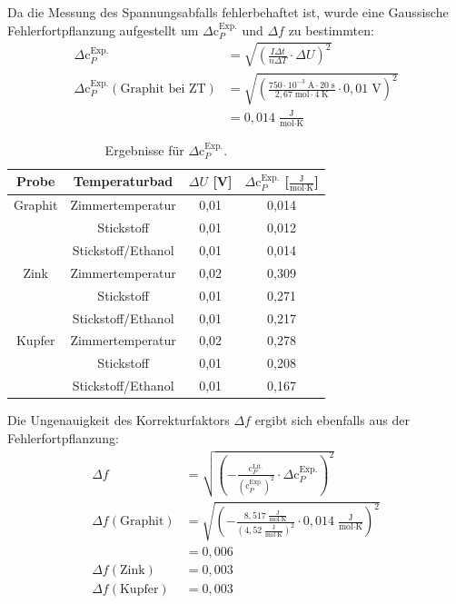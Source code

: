 \documentclass[12pt,a4paper,titlepage,headinclude,bibtotoc]{scrartcl}
\begin{document}
Da die Messung des Spannungsabfalls fehlerbehaftet ist, wurde eine Gaussische Fehlerfortpflanzung aufgestellt um $\Delta\text{c}_P^{\text{Exp.}}$ und $\Delta f$ zu bestimmten:
\begin{align}
\Delta \text{c}_P^{\text{Exp.}}&=\sqrt{ \left(\frac{I\Delta t}{n\Delta T}\cdot \Delta U \right)^2}\\
\Delta \text{c}_P^{\text{Exp.}}(\text{Graphit bei ZT})&=\sqrt{ \left(\frac{750\cdot 10^{-3}\;\text{A} \cdot 20\;\text{s}}{2,67\;\text{mol}\cdot 4\;\text{K}}\cdot 0,01\;\text{V} \right)^2}\\
&=0,014 \;\frac{\text{J}}{\text{mol}\cdot\text{K}}
\end{align}
\begin{table}[h!]
\centering
\caption{Ergebnisse für $\Delta \text{c}_P^{\text{Exp.}}$.}
\begin{tabular}{c|c|c|c}
Probe&Temperaturbad&$\Delta U$ [V]&$\Delta \text{c}_P^{\text{Exp.}}$ [$\frac{\text{J}}{\text{mol}\cdot\text{K}}$]\\
\hline
Graphit& Zimmertemperatur&0,01&0,014\\
\hline
&Stickstoff&0,01&0,012\\
\hline
&Stickstoff/Ethanol&0,01&0,014\\
\hline
Zink &Zimmertemperatur&0,02& 0,309 \\
\hline
&Stickstoff&0,01&0,271\\
\hline
&Stickstoff/Ethanol&0,01&0,217\\
\hline
Kupfer &Zimmertemperatur&0,02& 0,278\\
\hline
&Stickstoff&0,01&0,208\\
\hline
&Stickstoff/Ethanol&0,01&0,167\\
\end{tabular}
\end{table}
\FloatBarrier
Die Ungenauigkeit des Korrekturfaktors $\Delta f$ ergibt sich ebenfalls aus der Fehlerfortpflanzung:
\begin{align}
\Delta f &= \sqrt{ \left(-\frac{\text{c}_P^{\text{Lit.}}}{(\text{c}_P^{\text{Exp.}})^2}\cdot \Delta \text{c}_P^{\text{Exp.}} \right)^2}\\
\Delta f (\text{Graphit})&= \sqrt{ \left(-\frac{8,517\;\frac{\text{J}}{\text{mol}\cdot\text{K}}}{(4,52\;\frac{\text{J}}{\text{mol}\cdot\text{K}})^2}\cdot 0,014\;\frac{\text{J}}{\text{mol}\cdot\text{K}}\right)^2}\\
&= 0,006\\
\Delta f (\text{Zink})&=0,003\\ 
\Delta f (\text{Kupfer})&=0,003\\
\end{align} 
\end{document}
